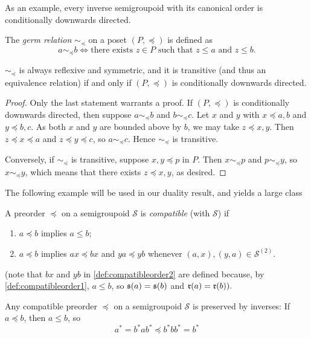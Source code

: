 As an example, every inverse semigroupoid with its canonical order is conditionally downwards directed.

The \emph{germ relation} $\sim_{\preceq}$ on a poset $(P,\preceq)$ is defined as
\[a\sim_{\preceq} b\iff\text{there exists }z\in P\text{ such that } z\leq a\text{ and }z\leq b.\]

\begin{lemma}
$\sim_\preceq$ is always reflexive and symmetric, and it is transitive (and thus an equivalence relation) if and only if $(P,\preceq)$ is conditionally downwards directed.
\end{lemma}
\begin{proof}
    Only the last statement warrants a proof. If $(P,\preceq)$ is conditionally downwards directed, then suppose $a\sim_{\preceq} b$ and $b\sim_{\preceq} c$. Let $x$ and $y$ with $x\preceq a,b$ and $y\preceq b,c$. As both $x$ and $y$ are bounded above by $b$, we may take $z\preceq x,y$. Then $z\preceq x\preceq a$ and $z\preceq y\preceq c$, so $a\sim_\preceq c$. Hence $\sim_\preceq$ is transitive.
    
    Conversely, if $\sim_\preceq$ is transitive, suppose $x,y\preceq p$ in $P$. Then $x\sim_\preceq p$ and $p\sim_\preceq y$, so $x\sim_\preceq y$, which means that there exists $z\preceq x,y$, as desired.\qedhere
\end{proof}

The following example will be used in our duality result, and yields a large class 

\begin{definition}\label{def:compatibleorder}
    A preorder $\preceq$ on a semigroupoid $\mathcal{S}$ is \emph{compatible} (with $\mathcal{S}$) if
    \begin{enumerate}[label=(\roman*)]
        \item\label{def:compatibleorder1} $a\preceq b$ implies $a\leq b$;
        \item\label{def:compatibleorder2} $a\preceq b$ implies $ax\preceq bx$ and $ya\preceq yb$ whenever $(a,x),(y,a)\in\mathcal{S}^{(2)}$.
    \end{enumerate}
    (note that $bx$ and $yb$ in \ref{def:compatibleorder2} are defined because, by \ref{def:compatibleorder1}, $a\leq b$, so $\operatorname{\mathfrak{s}}(a)=\operatorname{\mathfrak{s}}(b)$ and $\operatorname{\mathfrak{r}}(a)=\operatorname{\mathfrak{r}}(b)).$
\end{definition}

Any compatible preorder $\preceq$ on a semigroupoid $\mathcal{S}$ is preserved by inverses: If $a\preceq b$, then $a\leq b$, so
\[a^*=b^*ab^*\preceq b^*bb^*=b^*\]

